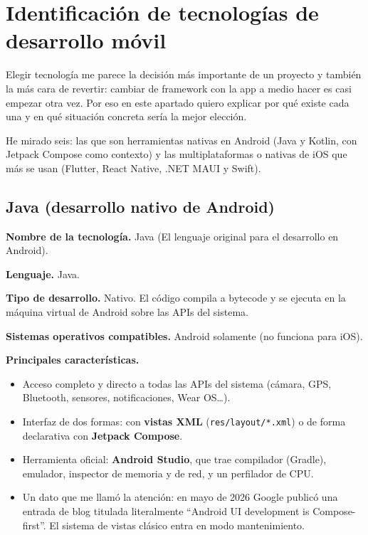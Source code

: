 \documentclass[11pt,a4paper]{article}
\newcommand{\code}[1]{\texttt{\color{ink}#1}}
\newcommand{\campo}[1]{\textbf{\color{ink}#1}}
\begin{document}
	\section{Identificación de tecnologías de desarrollo móvil}
	
	Elegir tecnología me parece la decisión más importante de un proyecto y también la más cara de revertir: cambiar de framework con la app a medio hacer es casi empezar otra vez. Por eso en este apartado quiero explicar por qué existe cada una y en qué situación concreta sería la mejor elección.
	
	He mirado seis: las que son herramientas nativas en Android (Java y Kotlin, con Jetpack Compose como contexto) y las multiplataformas o nativas de iOS que más se usan (Flutter, React Native, .NET MAUI y Swift).
	
	\subsection{Java (desarrollo nativo de Android)}
	
  \campo{Nombre de la tecnología.} Java (El lenguaje original para el desarrollo en Android).
	
	\campo{Lenguaje.} Java.
	
	\campo{Tipo de desarrollo.} Nativo. El código compila a bytecode y se ejecuta en la máquina virtual de Android sobre las APIs del sistema.
	
	\campo{Sistemas operativos compatibles.} Android solamente (no funciona para iOS).
	
	\campo{Principales características.}
	\begin{itemize}[leftmargin=*,itemsep=0.2em,topsep=0.2em]
		\item Acceso completo y directo a todas las APIs del sistema (cámara, GPS, Bluetooth, sensores, notificaciones, Wear OS\ldots).
		\item Interfaz de dos formas: con \textbf{vistas XML} (\code{res/layout/*.xml}) o de forma declarativa con \textbf{Jetpack Compose}.
		\item Herramienta oficial: \textbf{Android Studio}, que trae compilador (Gradle), emulador, inspector de memoria y de red, y un perfilador de CPU.
		\item Un dato que me llamó la atención: en mayo de 2026 Google publicó una entrada de blog titulada literalmente \enquote{Android UI development is Compose-first}. El sistema de vistas clásico entra en modo mantenimiento.
	\end{itemize}
	
\end{document}
